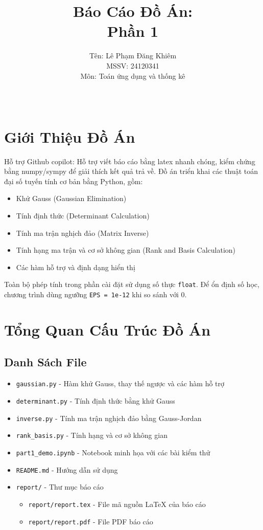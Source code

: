 \documentclass[12pt, a4paper, twoside]{article}
\title{\textbf{Báo Cáo Đồ Án:\\ \Huge Phần 1}}
\author{Tên: Lê Phạm Đăng Khiêm\\MSSV: 24120341\\Môn: Toán ứng dụng và thống kê}
\date{\\}
\begin{document}
\maketitle

\tableofcontents
\newpage
\section{Giới Thiệu Đồ Án}
Hỗ trợ Github copilot: Hỗ trợ viết báo cáo bằng latex nhanh chóng, kiểm chứng bằng numpy/sympy để giải thích kết quả trả về.
Đồ án triển khai các thuật toán đại số tuyến tính cơ bản bằng Python, gồm:
\begin{itemize}
    \item Khử Gauss (Gaussian Elimination)
    \item Tính định thức (Determinant Calculation)
    \item Tính ma trận nghịch đảo (Matrix Inverse)
    \item Tính hạng ma trận và cơ sở không gian (Rank and Basis Calculation)
    \item Các hàm hỗ trợ và định dạng hiển thị
\end{itemize}

Toàn bộ phép tính trong phần cài đặt sử dụng số thực \texttt{float}. Để ổn định số học, chương trình dùng ngưỡng \texttt{EPS = 1e-12} khi so sánh với 0.

\section{Tổng Quan Cấu Trúc Đồ Án}

\subsection{Danh Sách File}
\begin{itemize}
    \item \texttt{gaussian.py} - Hàm khử Gauss, thay thế ngược và các hàm hỗ trợ
    \item \texttt{determinant.py} - Tính định thức bằng khử Gauss
    \item \texttt{inverse.py} - Tính ma trận nghịch đảo bằng Gauss-Jordan
    \item \texttt{rank\_basis.py} - Tính hạng và cơ sở không gian
    \item \texttt{part1\_demo.ipynb} - Notebook minh họa với các bài kiểm thử
    \item \texttt{README.md} - Hướng dẫn sử dụng
    \item \texttt{report/} - Thư mục báo cáo
    \begin{itemize}
        \item \texttt{report/report.tex} - File mã nguồn LaTeX của báo cáo
        \item \texttt{report/report.pdf} - File PDF báo cáo
    \end{itemize}
\end{itemize}
\end{document}

